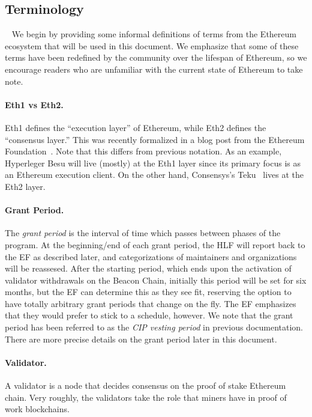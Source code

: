 \subsection{Terminology}~\label{sec:defs}
We begin by providing some informal definitions of terms from the Ethereum ecosystem that will be used in this document.  We emphasize that some of these terms have been redefined by the community over the lifespan of Ethereum, so we encourage readers who are unfamiliar with the current state of Ethereum to take note.

\paragraph{Eth1 vs Eth2.}  Eth1 defines the ``execution layer'' of Ethereum, while Eth2 defines the ``consensus layer.''  This was recently formalized in a blog post from the Ethereum Foundation~\cite{Eth1-2}.  Note that this differs from previous notation.  As an example, Hyperleger Besu will live (mostly) at the Eth1 layer since its primary focus is as an Ethereum execution client.  On the other hand, Consensys's Teku~\cite{Teku} lives at the Eth2 layer.

\paragraph{Grant Period.}  The \emph{grant period} is the interval of time which passes between phases of the program.  At the beginning/end of each grant period, the HLF will report back to the EF as described later, and categorizations of maintainers and organizations will be reassesed.  After the starting period, which ends upon the activation of validator withdrawals on the Beacon Chain, initially this period will be set for six months, but the EF can determine this as they see fit, reserving the option to have totally arbitrary grant periods that change on the fly.  The EF emphasizes that they would prefer to stick to a schedule, however.  We note that the grant period has been referred to as the \emph{CIP vesting period} in previous documentation.  There are more precise details on the grant period later in this document.

\paragraph{Validator.}  A validator is a node that decides consensus on the proof of stake Ethereum chain.  Very roughly, the validators take the role that miners have in proof of work blockchains.

